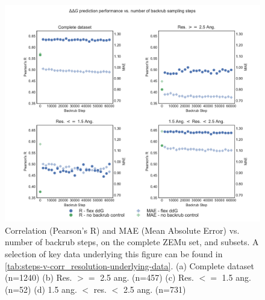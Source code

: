 \begin{figure}
  \includegraphics[width=\textwidth,keepaspectratio]{steps-v-corr_resolution.pdf}
  \caption[Flex ddG performance vs. number of backrub steps]{
    Correlation (Pearson's R) and MAE (Mean Absolute Error) vs. number of backrub steps, on the complete ZEMu set, and subsets.
    A selection of key data underlying this figure can be found in \cref{tab:steps-v-corr_resolution-underlying-data}.
    (a) Complete dataset (n=1240)
    (b) Res. $>=$ 2.5 ang. (n=457)
    (c) Res. $<=$ 1.5 ang. (n=52)
    (d) 1.5 ang. $<$ res. $<$ 2.5 ang. (n=731)
  } \label{fig:steps-v-corr_resolution}
\end{figure}
